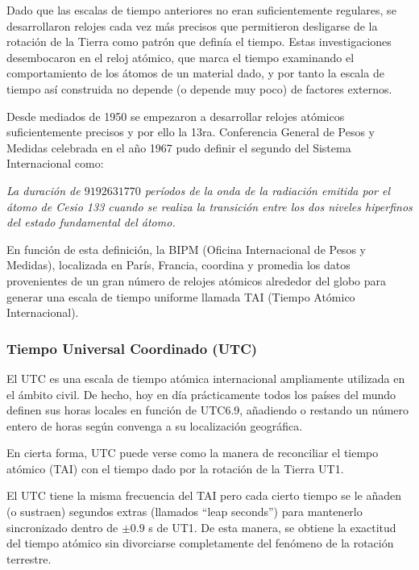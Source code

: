  Dado que las escalas de tiempo anteriores no eran suficientemente regulares, se desarrollaron relojes cada vez más precisos que permitieron desligarse de la rotación de la Tierra como patrón que definía el tiempo. Estas investigaciones desembocaron en el reloj atómico, que marca el tiempo examinando el comportamiento de los átomos de un material dado, y por tanto la escala de tiempo así construida no depende (o depende muy poco) de factores externos.

 \begin{myboxAzul}{}
   Desde mediados de 1950 se empezaron a desarrollar relojes atómicos
   suficientemente precisos y por ello la 13ra. Conferencia General de
   Pesos y Medidas celebrada en el año 1967 pudo definir el segundo
   del Sistema Internacional como: \vspace{3mm}

   {\it La duración de $9192631770$ períodos de la onda de la
     radiación emitida por el átomo de Cesio 133 cuando se realiza la
     transición entre los dos niveles hiperfinos del estado
     fundamental del átomo.}
\end{myboxAzul}

En función de esta definición, la BIPM (Oficina Internacional de Pesos y Medidas), localizada en París, Francia, coordina y promedia los datos provenientes de un gran número de relojes atómicos alrededor del globo para generar una escala de tiempo uniforme llamada TAI (Tiempo Atómico Internacional). 



\subsubsection{Tiempo Universal Coordinado (UTC)}
\label{sec:tiempo.universal.coordinado}
 El UTC es una escala de tiempo atómica internacional ampliamente utilizada en el ámbito civil. De hecho, hoy en día prácticamente todos los países del mundo definen sus horas locales en función de UTC6.9, añadiendo o restando un número entero de horas según convenga a su localización geográfica.

En cierta forma, UTC puede verse como la manera de reconciliar el tiempo atómico (TAI) con el tiempo dado por la rotación de la Tierra  UT1.

\begin{myboxAzul}{}
  El UTC tiene la misma frecuencia del TAI pero cada cierto tiempo se le
  añaden (o sustraen) segundos extras (llamados ``leap seconds'') para
  mantenerlo sincronizado dentro de $\pm 0.9$ s de UT1. De esta
  manera, se obtiene la exactitud del tiempo atómico sin divorciarse
  completamente del fenómeno de la rotación terrestre.
\end{myboxAzul}

